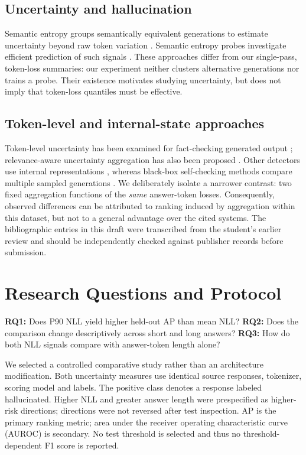 \documentclass[manuscript,screen]{acmart}
\begin{document}
\subsection{Uncertainty and hallucination}
Semantic entropy groups semantically equivalent generations to estimate uncertainty beyond raw token variation \cite{kuhn2023,farquhar2024}. Semantic entropy probes investigate efficient prediction of such signals \cite{kossen2024}. These approaches differ from our single-pass, token-loss summaries: our experiment neither clusters alternative generations nor trains a probe. Their existence motivates studying uncertainty, but does not imply that token-loss quantiles must be effective.

\subsection{Token-level and internal-state approaches}
Token-level uncertainty has been examined for fact-checking generated output \cite{fadeeva2024}; relevance-aware uncertainty aggregation has also been proposed \cite{duan2024}. Other detectors use internal representations \cite{azaria2023,chen2024}, whereas black-box self-checking methods compare multiple sampled generations \cite{manakul2023}. We deliberately isolate a narrower contrast: two fixed aggregation functions of the \emph{same} answer-token losses. Consequently, observed differences can be attributed to ranking induced by aggregation within this dataset, but not to a general advantage over the cited systems. The bibliographic entries in this draft were transcribed from the student's earlier review and should be independently checked against publisher records before submission.

\section{Research Questions and Protocol}
\textbf{RQ1:} Does P90 NLL yield higher held-out AP than mean NLL? \textbf{RQ2:} Does the comparison change descriptively across short and long answers? \textbf{RQ3:} How do both NLL signals compare with answer-token length alone?

We selected a controlled comparative study rather than an architecture modification. Both uncertainty measures use identical source responses, tokenizer, scoring model and labels. The positive class denotes a response labeled hallucinated. Higher NLL and greater answer length were prespecified as higher-risk directions; directions were not reversed after test inspection. AP is the primary ranking metric; area under the receiver operating characteristic curve (AUROC) is secondary. No test threshold is selected and thus no threshold-dependent F1 score is reported.
\end{document}
